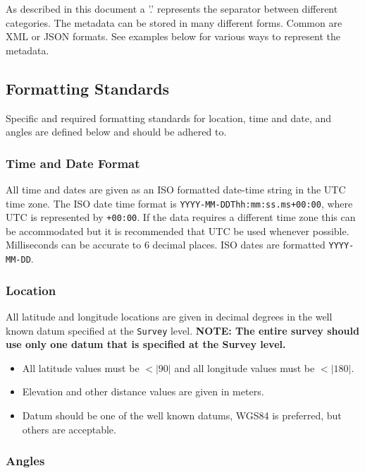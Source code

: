 \documentclass{article}
\begin{document}
As described in this document a '.' represents the separator between different categories.  The metadata can be stored in many different forms.  Common are XML or JSON formats.  See examples below for various ways to represent the metadata.      

\subsection{Formatting Standards}

Specific and required formatting standards for location, time and date, and angles are defined below and should be adhered to.

\subsubsection{Time and Date Format}

All time and dates are given as an ISO formatted date-time string in the UTC time zone.  The ISO date time format is \verb|YYYY-MM-DDThh:mm:ss.ms+00:00|, where UTC is represented by \verb|+00:00|. If the data requires a different time zone this can be accommodated but it is recommended that UTC be used whenever possible. Milliseconds can be accurate to 6 decimal places.  ISO dates are formatted \verb|YYYY-MM-DD|. 

\subsubsection{Location}

All latitude and longitude locations are given in decimal degrees in the well known datum specified at the \verb|Survey| level. \textbf{NOTE: The entire survey should use only one datum that is specified at the Survey level.}

\begin{itemize}
	\setlength\itemsep{0em}
	\item All latitude values must be $<|90|$ and all longitude values must be $<|180|$.
	\item Elevation and other distance values are given in meters.
	\item Datum should be one of the well known datums, WGS84 is preferred, but others are acceptable.
\end{itemize} 

\subsubsection{Angles}
\end{document}
